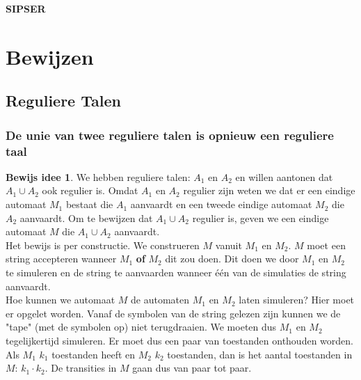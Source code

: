 \documentclass[12pt,a4paper]{article}
\theoremstyle{definition}
\newtheorem{bIdee}{Bewijs idee}[section]
\begin{document}
\newpage
\textbf{\LARGE SIPSER}\\

\section{Bewijzen}
\subsection{Reguliere Talen}
\subsubsection{De unie van twee reguliere talen is opnieuw een reguliere taal}
\begin{bIdee}
We hebben reguliere talen: $A_1$ en $A_2$ en willen aantonen dat $A_1 \cup A_2$ ook regulier is. Omdat $A_1$ en $A_2$ regulier zijn weten we dat er een eindige automaat $M_1$ bestaat die $A_1$ aanvaardt en een tweede eindige automaat $M_2$ die $A_2$ aanvaardt. Om te bewijzen dat $A_1 \cup A_2$ regulier is, geven we een eindige automaat $M$ die $A_1 \cup A_2$ aanvaardt.\\
Het bewijs is per constructie. We construeren $M$ vanuit $M_1$ en $M_2$. $M$ moet een string accepteren wanneer $M_1$ \textbf{of} $M_2$ dit zou doen. Dit doen we door $M_1$ en $M_2$ te simuleren en de string te aanvaarden wanneer één van de simulaties de string aanvaardt.\\
Hoe kunnen we automaat $M$ de automaten $M_1$ en $M_2$ laten simuleren? Hier moet er opgelet worden. Vanaf de symbolen van de string gelezen zijn kunnen we de "tape" (met de symbolen op) niet terugdraaien. We moeten dus $M_1$ en $M_2$ tegelijkertijd simuleren. Er moet dus een paar van toestanden onthouden worden. Als $M_1$ $k_1$ toestanden heeft en $M_2$ $k_2$ toestanden, dan is het aantal toestanden in $M$: $k_1 \cdot k_2$. De transities in $M$ gaan dus van paar tot paar. 
\end{bIdee}
\end{document}
